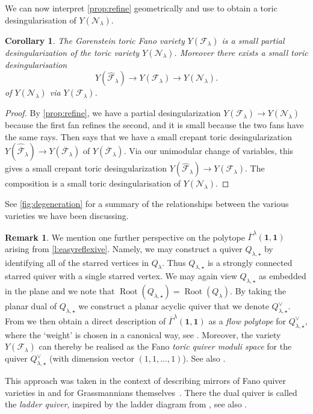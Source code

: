 \documentclass{amsart}
\newtheorem{corollary}[thm]{Corollary}
\theoremstyle{definition}
\newtheorem{remark}[thm]{Remark}
\numberwithin{equation}{section}
\newcommand{\FF}{\mathcal{F}}
\newcommand{\CC}{\mathcal{N}}
\newcommand{\Root}{\operatorname{Root}}
\begin{document}
We can now interpret \cref{prop:refine} geometrically and use \cite[Theorem E]{RWReflexive} to obtain a toric  desingularisation of $Y(\CC_\lambda)$. 




\begin{corollary}\label{cor:small}
The Gorenstein toric  Fano variety $Y(\FF_\lambda)$ 
is a small partial desingularization of the toric variety $Y(\CC_\lambda)$. 
Moreover 
there exists a  
small toric desingularisation 
$$Y(\widehat{\FF}_{\lambda}) \to 
	Y(\FF_{\lambda}) \to Y(\CC_{\lambda}).$$
	of $Y(\CC_{\lambda})$ via $Y(\FF_{\lambda})$.
\end{corollary}

\begin{proof}
By \cref{prop:refine}, we have a partial desingularization 
$Y(\FF_{\lambda}) \to Y(\CC_{\lambda})$ because the first fan refines the second, and it is small because the two fans have the same rays.
Then 
\cite[Theorem E]{RWReflexive} says that we have a 
small crepant toric desingularization 
$Y(\widehat{\overline{\FF}}_{\lambda}) \to 
Y(\overline{\FF}_{\lambda})$ of $Y(\overline{\FF}_{\lambda})$. 
Via our unimodular change of variables, this 
gives a small crepant toric desingularization 
$Y(\widehat{{\FF}}_{\lambda}) \to 
Y({\FF}_{\lambda})$. The composition is a small toric desingularisation of $Y(\CC_\lambda)$.
\end{proof}

See \cref{fig:degeneration} for a summary of  the relationships between the various varieties
we have been discussing.


\begin{remark} We mention one further perspective on the polytope $\overline\Gamma^{\lambda}(\mathbf 1,\mathbf 1)$ arising from  \cref{l:easyreflexive}. Namely, we may construct a quiver $Q_{\lambda,\star}$ by identifying all of the starred vertices in $Q_\lambda$. Thus $Q_{\lambda,\star}$ is a strongly connected starred quiver with a single starred vertex. We may again view $Q_{\lambda,\star}$ as embedded in the plane and we note that  $\Root(Q_{\lambda,\star})=\Root(Q_{\lambda})$. By taking the planar dual of $Q_{\lambda,\star}$ we construct a planar acyclic quiver that we denote $Q^\vee_{\lambda,\star}$. From \cite[Theorem~3.4]{RWReflexive} we then obtain a direct description of $\overline\Gamma^{\lambda}(\mathbf 1,\mathbf 1)$ as a \textit{flow polytope} for $Q_{\lambda,\star}^\vee$, where the `weight' is chosen in a canonical way, see \cite[Definition~3.1]{RWReflexive}. Moreover, the variety $Y(\FF_\lambda)$ can thereby be realised as the Fano \textit{toric quiver moduli space} for the quiver $Q^\vee_{\lambda,\star}$ (with dimension vector $(1,1,\dotsc,1)$). See also \cite[Remark 5.11]{RWReflexive}. 

This approach was taken in the context of describing mirrors of Fano quiver varieties in \cite{Kalashnikov} and for Grassmannians themselves~\cite{CDK}. There the dual quiver is called the \emph{ladder quiver}, inspired by the ladder diagram from \cite{BC-FKvS},
		see also \cite{AltmannvanStraten}.
\end{remark}
\end{document}
